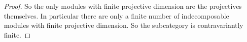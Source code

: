 \begin{example}
\begin{proof}
		So the only modules with finite projective dimension are the projectives themselves. In particular there are only a finite number of indecomposable modules with finite projective dimension. So the subcategory is contravariantly finite. 
	\end{proof}
\end{example}
